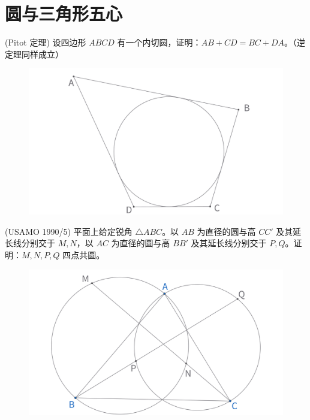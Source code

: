 \part{圆与三角形五心}

\begin{exercise}
    (Pitot 定理) 设四边形 $ABCD$ 有一个内切圆，证明：$AB + CD = BC + DA$。（逆定理同样成立）
\end{exercise}
\begin{figure}[H]
    \centering
    \includegraphics[width=0.7\linewidth]{figures/exercises/225.png}
\end{figure}


\begin{exercise}
    (USAMO 1990/5) 平面上给定锐角 $\triangle ABC$。以 ${AB}$ 为直径的圆与高 ${CC'}$ 及其延长线分别交于 $M, N$，以 ${AC}$ 为直径的圆与高 ${BB'}$ 及其延长线分别交于 $P, Q$。证明：$M, N, P, Q$ 四点共圆。
\end{exercise}
\begin{figure}[H]
    \centering
    \includegraphics[width=0.7\linewidth]{figures/exercises/226.png}
\end{figure}

